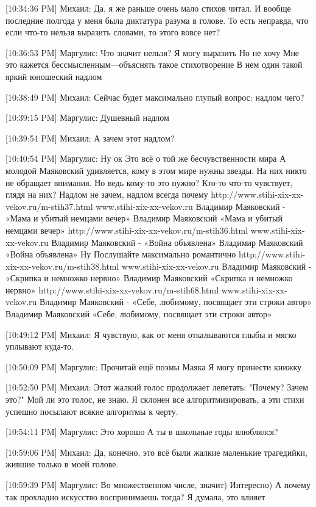 \documentclass{article}
\begin{document}
[10:34:36 PM] Михаил:
Да, я же раньше очень мало стихов читал. И вообще последние полгода у меня была диктатура разума в голове.
 То есть неправда, что если что-то нельзя выразить словами, то этого вовсе нет?

[10:36:53 PM] Маргулис:
Что значит нельзя?
 Я могу выразить
 Но не хочу
 Мне это кажется бессмысленным—объяснять такое стихотворение
 В нем один такой яркий юношеский надлом

[10:38:49 PM] Михаил:
Сейчас будет максимально глупый вопрос: надлом чего?

[10:39:15 PM] Маргулис:
Душевный надлом

[10:39:54 PM] Михаил:
А зачем этот надлом?

[10:40:54 PM] Маргулис:
Ну ок 
Это всё о той же бесчувственности мира 
А молодой Маяковский удивляется, кому в этом мире нужны звезды. На них никто не обращает внимания. Но ведь кому-то это нужно? Кто-то что-то чувствует, глядя на них?
 Надлом не зачем, надлом всегда почему
 http://www.stihi-xix-xx-vekov.ru/m-stih37.html
www.stihi-xix-xx-vekov.ru
Владимир Маяковский - «Мама и убитый немцами вечер»
Владимир Маяковский «Мама и убитый немцами вечер»
 http://www.stihi-xix-xx-vekov.ru/m-stih36.html
www.stihi-xix-xx-vekov.ru
Владимир Маяковский - «Война объявлена»
Владимир Маяковский «Война объявлена»
 Ну Послушайте максимально романтично
 http://www.stihi-xix-xx-vekov.ru/m-stih38.html
www.stihi-xix-xx-vekov.ru
Владимир Маяковский - «Скрипка и немножко нервно»
Владимир Маяковский «Скрипка и немножко нервно»
 http://www.stihi-xix-xx-vekov.ru/m-stih68.html
www.stihi-xix-xx-vekov.ru
Владимир Маяковский - «Себе, любимому, посвящает эти строки автор»
Владимир Маяковский «Себе, любимому, посвящает эти строки автор»

[10:49:12 PM] Михаил:
Я чувствую, как от меня откалываются глыбы и мягко уплывают куда-то.

[10:50:09 PM] Маргулис:
Прочитай ещё поэмы Маяка 
Я могу принести книжку

[10:52:50 PM] Михаил:
Этот жалкий голос продолжает лепетать: "Почему? Зачем это?" Мой ли это голос, не знаю.
 Я склонен все алгоритмизировать, а эти стихи успешно посылают всякие алгоритмы к черту.

[10:54:11 PM] Маргулис:
Это хорошо
 А ты в школьные годы влюблялся?

[10:59:06 PM] Михаил:
Да, конечно, это всё были жалкие маленькие трагедийки, жившие только в моей голове.

[10:59:39 PM] Маргулис:
Во множественном числе, значит)
 Интересно)
 А почему так прохладно искусство воспринимаешь тогда?
 Я думала, это влияет
\end{document}
